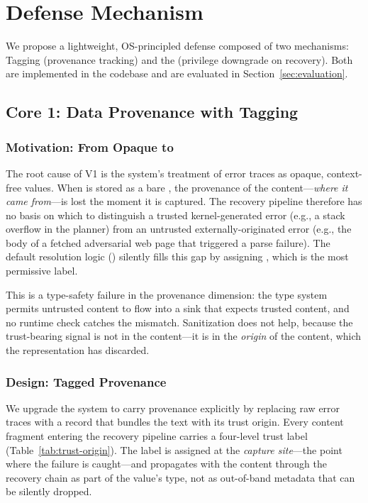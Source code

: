 
\section{Defense Mechanism}
\label{sec:defense}

We propose a lightweight, OS-principled defense composed of two mechanisms: \trustorigin{} Tagging (provenance tracking) and the \reauthgate{} (privilege downgrade on recovery). Both are implemented in the \system{} codebase and are evaluated in Section~\ref{sec:evaluation}.

\subsection{Core 1: Data Provenance with \trustorigin{} Tagging}
\label{sec:trustorigin}

\subsubsection{Motivation: From Opaque  to }
The root cause of V1 is the system's treatment of error traces as opaque, context-free  values. When  is stored as a bare , the provenance of the content---\emph{where it came from}---is lost the moment it is captured. The recovery pipeline therefore has no basis on which to distinguish a trusted kernel-generated error (e.g., a stack overflow in the planner) from an untrusted externally-originated error (e.g., the body of a fetched adversarial web page that triggered a parse failure). The default resolution logic () silently fills this gap by assigning , which is the most permissive label.

This is a type-safety failure in the provenance dimension: the type system permits untrusted content to flow into a sink that expects trusted content, and no runtime check catches the mismatch. Sanitization does not help, because the trust-bearing signal is not in the content---it is in the \emph{origin} of the content, which the  representation has discarded.

\subsubsection{Design: Tagged Provenance}
We upgrade the system to carry provenance explicitly by replacing raw  error traces with a  record that bundles the text with its trust origin. Every content fragment entering the recovery pipeline carries a four-level trust label (Table~\ref{tab:trust-origin}). The label is assigned at the \emph{capture site}---the point where the failure is caught---and propagates with the content through the recovery chain as part of the value's type, not as out-of-band metadata that can be silently dropped.

